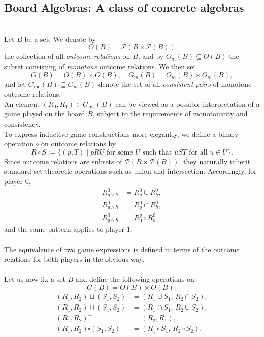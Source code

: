 \documentclass[12pt]{article}
\begin{document}
\subsection{Board Algebras: A class of concrete algebras} \\
Let \( B \) be a set. We denote by 
\[
O(B) = \mathcal{P}(B \times \mathcal{P}(B))
\]
the collection of all \emph{outcome relations} on \( B \), and by \( O_m(B) \subseteq O(B) \) the subset consisting of \emph{monotone} outcome relations.  
We then set
\[
G(B) = O(B) \times O(B), \quad 
G_m(B) = O_m(B) \times O_m(B),
\]
and let \( G_{\mathrm{mc}}(B) \subseteq G_m(B) \) denote the set of all \emph{consistent pairs} of monotone outcome relations.\\
An element \( (R_0, R_1) \in G_{\mathrm{mc}}(B) \) can be viewed as a possible interpretation of a game played on the board \( B \), subject to the requirements of monotonicity and consistency.\\
To express inductive game constructions more elegantly, we define a binary operation \( \circ \) on outcome relations by
\[
R \circ S := \{ (p, T) \mid pR U \text{ for some } U \text{ such that } uS T \text{ for all } u \in U \}.
\]
Since outcome relations are subsets of \( \mathcal{P}(B \times \mathcal{P}(B)) \), they naturally inherit standard set-theoretic operations such as union and intersection.  
Accordingly, for player \( 0 \),
\[
\begin{aligned}
R_{g \lor h}^0 &= R_g^0 \cup R_h^{0}, \\
R_{g \land h}^0 &= R_g^0 \cap R_h^0, \\
R_{g \lozenge h}^0 &= R^g_0 \circ R_h^0,
\end{aligned}
\]
and the same pattern applies to player \( 1 \).\\ \\
The equivalence of two game expressions is defined in terms of the outcome relations for both players in the obvious way. \\ \\ 
Let us now fix a set \( B \) and define the following operations on
\[
G(B) = O(B) \times O(B):
\]
\[
\begin{aligned}
(R_1, R_2) \sqcup (S_1, S_2) &= (R_1 \cup S_1,\, R_2 \cap S_2), \\
(R_1, R_2) \sqcap (S_1, S_2) &= (R_1 \cap S_1,\, R_2 \cup S_2), \\
(R_1, R_2)^{-} &= (R_2, R_1), \\
(R_1, R_2) \square (S_1, S_2) &= (R_1 \circ S_1,\, R_2 \circ S_2).
\end{aligned}
\] \\
\end{document}

